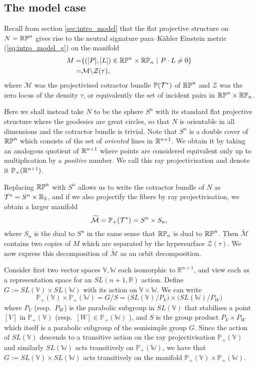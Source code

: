 \subsection{The model case}

Recall from section \ref{sec:intro_model} that the flat projective structure on $N=\mathbb{RP}^n$ gives rise to 
the neutral signature para--K\"ahler Einstein metric (\ref{eq:intro_model_g}) on the manifold
\begin{align*}
M=&\{([P],[L])\in\mathbb{RP}^n\times\mathbb{RP}_n\ |\ P\cdot L\neq 0\} \\
=& \mathcal{M}\backslash\mathcal{Z}(\tau),
\end{align*}
where $\mathcal{M}$ was the projectivised cotractor bundle $\mathbb{P}(\mathcal{T}^*)$ of $\mathbb{RP}^n$ and $\mathcal{Z}$ was the zero locus of the density $\tau$, or equivalently the set of incident pairs in $\mathbb{RP}^n\times\mathbb{RP}_n$.

Here we shall instead take $N$ to be the sphere $S^n$ with its standard flat projective structure where the geodesics are great circles, so that $N$ is orientable in all dimensions and the cotractor bundle is trivial. Note that $S^n$ is a double cover of $\mathbb{RP}^n$ which consists of the set of \textit{oriented} lines in $\mathbb{R}^{n+1}$. We obtain it by taking an analogous quotient of $\mathbb{R}^{n+1}$ where points are considered equivalent only up to multiplication by a \textit{positive} number. We call this ray projectivisation and denote it $\mathbb{P}_+(\mathbb{R}^{n+1})$.

Replacing $\mathbb{RP}^n$ with $S^n$ allows us to write the cotractor bundle of $N$ as $\mathcal{T}^*=S^n\times\mathbb{R}_3$, and if we also projectify the fibers by ray projectivisation, we obtain a larger manifold
\[
\widetilde{\mathcal{M}}=\mathbb{P}_+(\mathcal{T}^*)=S^n\times S_n,
\]
where $S_n$ is the dual to $S^n$ in the same sense that $\mathbb{RP}_n$ is dual to $\mathbb{RP}^n$. Then $\widetilde{\mathcal{M}}$ contains two copies of $M$ which are separated by the hypersurface $\mathcal{Z}(\tau)$. We now express this decomposition of $\widetilde{\mathcal{M}}$ as an orbit decomposition.

Consider first two vector spaces $\mathbb{V},\mathbb{W}$ each isomorphic to $\mathbb{R}^{n+1}$, and view each as a representation space for an $SL(n+1,\mathbb{R})$ action. Define $G:= SL(\mathbb{V})\times SL(\mathbb{W})$ with its action on $\mathbb{V}\times \mathbb{W}$. We can write 
\[
\mathbb{P}_+(\mathbb{V}) \times \mathbb{P}_+(\mathbb{W})=G/S=\big( SL(\mathbb{V})/P_V \big)\times \big( SL(\mathbb{W})/P_W \big)
\]
where $P_V$ (resp.\ $P_W$) is the parabolic subgroup in $SL(\mathbb{V})$
that stabilises a point $[V]$ in $\mathbb{P}_+(\mathbb{V})$ (resp.\ $[W] \in \mathbb{P}_+(\mathbb{W})$
), and $S$ is the group product $P_V\times P_W$ which itself is a
parabolic subgroup of the semisimple group $G$.
Since the action of $SL(\mathbb{V})$ descends to a transitive action on the ray projectivisation $\mathbb{P}_+(\mathbb{V})$ and similarly $SL(\mathbb{W})$ acts
transitively on $\mathbb{P}_+(\mathbb{W})$, we have that $G:= SL(\mathbb{V})\times SL(\mathbb{W})$ acts transitively on the manifold $\mathbb{P}_+(\mathbb{V}) \times \mathbb{P}_+(\mathbb{W})$.


